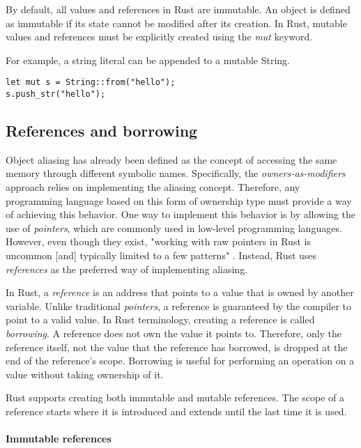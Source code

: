 \documentclass[sigplan,11pt,nonacm]{acmart}
\begin{document}
By default, all values and references in Rust are immutable.
An object is defined as immutable if its state cannot be modified after its creation.
In Rust, mutable values and references must be explicitly created using the \emph{mut} keyword.

For example, a string literal can be appended to a mutable String.
\begin{lstlisting}
let mut s = String::from("hello");
s.push_str("hello");
\end{lstlisting}


\subsection{References and borrowing}
\label{sec:rust-references}

Object aliasing has already been defined as the concept of accessing the same memory through different symbolic names.
Specifically, the \emph{owners-as-modifiers} approach relies on implementing the aliasing concept.
Therefore, any programming language based on this form of ownership type must provide a way of achieving this behavior.
One way to implement this behavior is by allowing the use of \emph{pointers}, which are commonly used in low-level programming languages.
However, even though they exist, "working with raw pointers in Rust is uncommon [and] typically limited to a few patterns" \cite{rust-pointer-documentation}.
Instead, Rust uses \emph{references} as the preferred way of implementing aliasing.

In Rust, a \emph{reference} is an address that points to a value that is owned by another variable.
Unlike traditional \emph{pointers}, a reference is guaranteed by the compiler to point to a valid value.
In Rust terminology, creating a reference is called \emph{borrowing}.
A reference does not own the value it points to.
Therefore, only the reference itself, not the value that the reference has borrowed, is dropped at the end of the reference's scope.
Borrowing is useful for performing an operation on a value without taking ownership of it.

Rust supports creating both immutable and mutable references.
The scope of a reference starts where it is introduced and extends until the last time it is used.

\paragraph{Immutable references}
\end{document}
